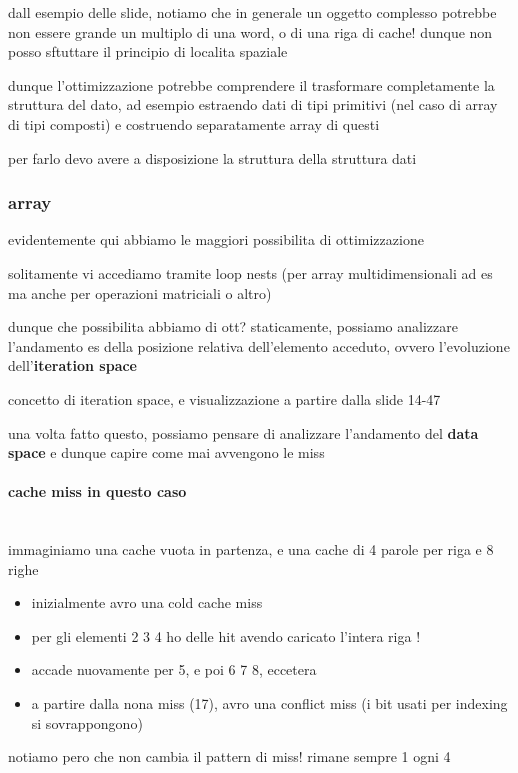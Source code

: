 dall esempio delle slide, notiamo che in generale un oggetto complesso potrebbe non essere grande un multiplo di una word, o di una riga di cache! dunque non posso sftuttare il principio di localita spaziale

dunque l'ottimizzazione potrebbe comprendere il trasformare completamente la struttura del dato, ad esempio estraendo dati di tipi primitivi (nel caso di array di tipi composti) e costruendo separatamente array di questi 

per farlo devo avere a disposizione la struttura della struttura dati

\subsubsection{array}

evidentemente qui abbiamo le maggiori possibilita di ottimizzazione

solitamente vi accediamo tramite loop nests (per array multidimensionali ad es ma anche per operazioni matriciali o altro)

dunque che possibilita abbiamo di ott? staticamente, possiamo analizzare l'andamento es della posizione relativa dell'elemento acceduto, ovvero l'evoluzione dell'\textbf{iteration space}

concetto di iteration space, e visualizzazione a partire dalla slide 14-47

una volta fatto questo, possiamo pensare di analizzare l'andamento del \textbf{data space} e dunque capire come mai avvengono le miss

\paragraph{cache miss in questo caso}~\\

immaginiamo una cache vuota in partenza, e una cache di 4 parole per riga e 8 righe
\begin{itemize}
  \item inizialmente avro una cold cache miss
  \item per gli elementi 2 3 4 ho delle hit avendo caricato l'intera riga !
  \item accade nuovamente per 5, e poi 6 7 8, eccetera
  \item a partire dalla nona miss (17), avro una conflict miss (i bit usati per indexing si sovrappongono)
\end{itemize}
 notiamo pero che non cambia il pattern di miss! rimane sempre 1 ogni 4

